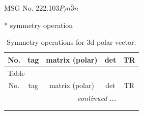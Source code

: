 \documentclass[fleqn,8pt]{jsarticle}
\begin{document}
\setcounter{MaxMatrixCols}{32}

\renewcommand{\tablename}{Table~}
\renewcommand{\figurename}{Figure~}
\begin{center}
\LARGE
MSG No. 222.103\quad$P_{I}n\bar{3}n$
\end{center}
* symmetry operation
\renewcommand{\arraystretch}{1.3}
\begin{longtable}{ccccc}
\caption{Symmetry operations for 3d polar vector.}
 \\
 \hline \hline
No. & tag & matrix (polar) & det & TR \\ \hline \endfirsthead

\multicolumn{4}{l}{\tablename\ \thetable{}} \\
 \hline \hline
No. & tag & matrix (polar) & det & TR \\ \hline \endhead

 \hline \hline
\multicolumn{4}{r}{\footnotesize\it continued ...} \\ \endfoot

 \hline \hline
\multicolumn{4}{r}{} \\ \endlastfoot


\end{longtable}
\end{document}
